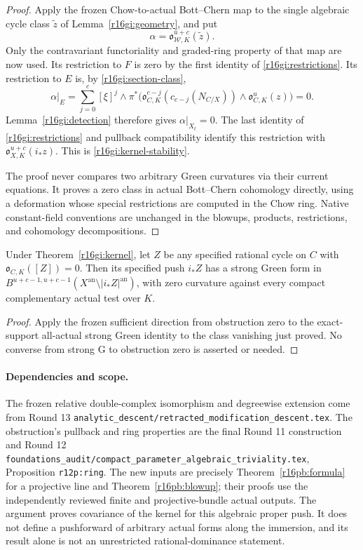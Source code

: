 \begin{proof}
Apply the frozen Chow-to-actual Bott--Chern map to the single
algebraic cycle class $\widetilde z$ of
Lemma~\ref{r16gi:geometry}, and put
\[
 \alpha=\mathfrak o_{\mathcal W,K}^{u+c}(\widetilde z).
\]
Only the contravariant functoriality and graded-ring property of
that map are now used.  Its restriction to $F$ is zero by the
first identity of \eqref{r16gi:restrictions}.  Its restriction
to $E$ is, by \eqref{r16gi:section-class},
\[
 \alpha|_E=
   \sum_{j=0}^{c}[\xi]^j\wedge
      \pi^*\bigl(\mathfrak o_{C,K}^{c-j}(c_{c-j}(N_{C/X}))
                       \wedge\mathfrak o_{C,K}^{u}(z)\bigr)=0.
 \tag{GI16.6}\label{r16gi:exceptional-zero}
\]
Lemma~\ref{r16gi:detection} therefore gives $\alpha|_{X_t}=0$.
The last identity of \eqref{r16gi:restrictions} and pullback
compatibility identify this restriction with
$\mathfrak o_{X,K}^{u+c}(i_*z)$.  This is
\eqref{r16gi:kernel-stability}.

The proof never compares two arbitrary Green curvatures via their
current equations.  It proves a zero class in actual Bott--Chern
cohomology directly, using a deformation whose special restrictions
are computed in the Chow ring.  Native constant-field conventions
are unchanged in the blowups, products, restrictions, and
cohomology decompositions.
\end{proof}

\begin{corollary}
\label{r16gi:strong-G}
Under Theorem~\ref{r16gi:kernel}, let $Z$ be any specified rational
cycle on $C$ with $\mathfrak o_{C,K}([Z])=0$.  Then its specified
push $i_*Z$ has a strong Green form in
$B^{u+c-1,u+c-1}(X^{\mathrm{an}}\setminus|i_*Z|^{\mathrm{an}})$,
with zero curvature against every compact complementary actual
test over $K$.
\end{corollary}

\begin{proof}
Apply the frozen sufficient direction from obstruction zero to
the exact-support all-actual strong Green identity to the class
vanishing just proved.  No converse from strong G to obstruction
zero is asserted or needed.
\end{proof}

\paragraph{Dependencies and scope.}
The frozen relative double-complex isomorphism and degreewise
extension come from Round 13
\texttt{analytic\_descent/retracted\_modification\_descent.tex}.
The obstruction's pullback and ring properties are the final
Round 11 construction and Round 12
\texttt{foundations\_audit/compact\_parameter\_algebraic\_triviality.tex},
Proposition \texttt{r12p:ring}.  The new inputs are precisely
Theorem~\ref{r16pb:formula} for a projective line and
Theorem~\ref{r16pb:blowup}; their proofs use the independently
reviewed finite and projective-bundle actual outputs.
The argument proves covariance of the kernel for this algebraic
proper push.  It does not define a pushforward of arbitrary actual
forms along the immersion, and its result alone is not an
unrestricted rational-dominance statement.
